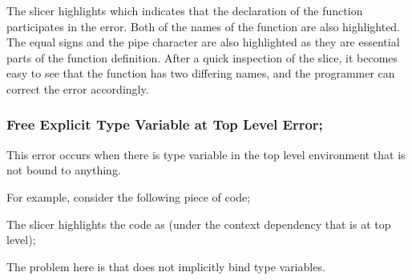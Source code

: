 \documentclass{report}
\begin{document}
\begin{itemize}

The slicer highlights  which indicates that the
declaration of the function participates in the error. Both of the
names of the function are also highlighted. The equal signs and the
pipe character are also highlighted as they are essential parts of the
function definition. After a quick inspection of the slice, it becomes
easy to see that the function has two differing names, and the
programmer can correct the error accordingly.




\newpage


\subsubsection{Free Explicit Type Variable at Top Level Error;}

\subitem This error occurs when there is type variable in the top
level environment that is not bound to anything.


For example, consider the following piece of code;


The slicer highlights the code as (under the context dependency that
 is at top level);


The problem here is that  does not implicitly
bind type variables.


\vspace{0.5in}


\end{itemize}
\end{document}
